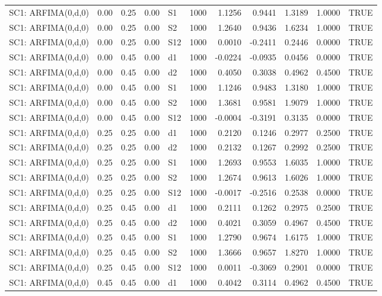 \begin{table}[ht]
\begin{tabular}{lrrrlrrrrrl}
  SC1: ARFIMA(0,d,0) & 0.00 & 0.25 & 0.00 & S1 & 1000 & 1.1256 & 0.9441 & 1.3189 & 1.0000 & TRUE \\ 
  SC1: ARFIMA(0,d,0) & 0.00 & 0.25 & 0.00 & S2 & 1000 & 1.2640 & 0.9436 & 1.6234 & 1.0000 & TRUE \\ 
  SC1: ARFIMA(0,d,0) & 0.00 & 0.25 & 0.00 & S12 & 1000 & 0.0010 & -0.2411 & 0.2446 & 0.0000 & TRUE \\ 
  SC1: ARFIMA(0,d,0) & 0.00 & 0.45 & 0.00 & d1 & 1000 & -0.0224 & -0.0935 & 0.0456 & 0.0000 & TRUE \\ 
  SC1: ARFIMA(0,d,0) & 0.00 & 0.45 & 0.00 & d2 & 1000 & 0.4050 & 0.3038 & 0.4962 & 0.4500 & TRUE \\ 
  SC1: ARFIMA(0,d,0) & 0.00 & 0.45 & 0.00 & S1 & 1000 & 1.1246 & 0.9483 & 1.3180 & 1.0000 & TRUE \\ 
  SC1: ARFIMA(0,d,0) & 0.00 & 0.45 & 0.00 & S2 & 1000 & 1.3681 & 0.9581 & 1.9079 & 1.0000 & TRUE \\ 
  SC1: ARFIMA(0,d,0) & 0.00 & 0.45 & 0.00 & S12 & 1000 & -0.0004 & -0.3191 & 0.3135 & 0.0000 & TRUE \\ 
  SC1: ARFIMA(0,d,0) & 0.25 & 0.25 & 0.00 & d1 & 1000 & 0.2120 & 0.1246 & 0.2977 & 0.2500 & TRUE \\ 
  SC1: ARFIMA(0,d,0) & 0.25 & 0.25 & 0.00 & d2 & 1000 & 0.2132 & 0.1267 & 0.2992 & 0.2500 & TRUE \\ 
  SC1: ARFIMA(0,d,0) & 0.25 & 0.25 & 0.00 & S1 & 1000 & 1.2693 & 0.9553 & 1.6035 & 1.0000 & TRUE \\ 
  SC1: ARFIMA(0,d,0) & 0.25 & 0.25 & 0.00 & S2 & 1000 & 1.2674 & 0.9613 & 1.6026 & 1.0000 & TRUE \\ 
  SC1: ARFIMA(0,d,0) & 0.25 & 0.25 & 0.00 & S12 & 1000 & -0.0017 & -0.2516 & 0.2538 & 0.0000 & TRUE \\ 
  SC1: ARFIMA(0,d,0) & 0.25 & 0.45 & 0.00 & d1 & 1000 & 0.2111 & 0.1262 & 0.2975 & 0.2500 & TRUE \\ 
  SC1: ARFIMA(0,d,0) & 0.25 & 0.45 & 0.00 & d2 & 1000 & 0.4021 & 0.3059 & 0.4967 & 0.4500 & TRUE \\ 
  SC1: ARFIMA(0,d,0) & 0.25 & 0.45 & 0.00 & S1 & 1000 & 1.2790 & 0.9674 & 1.6175 & 1.0000 & TRUE \\ 
  SC1: ARFIMA(0,d,0) & 0.25 & 0.45 & 0.00 & S2 & 1000 & 1.3666 & 0.9657 & 1.8270 & 1.0000 & TRUE \\ 
  SC1: ARFIMA(0,d,0) & 0.25 & 0.45 & 0.00 & S12 & 1000 & 0.0011 & -0.3069 & 0.2901 & 0.0000 & TRUE \\ 
  SC1: ARFIMA(0,d,0) & 0.45 & 0.45 & 0.00 & d1 & 1000 & 0.4042 & 0.3114 & 0.4962 & 0.4500 & TRUE \\ 

\end{tabular}
\end{table}
